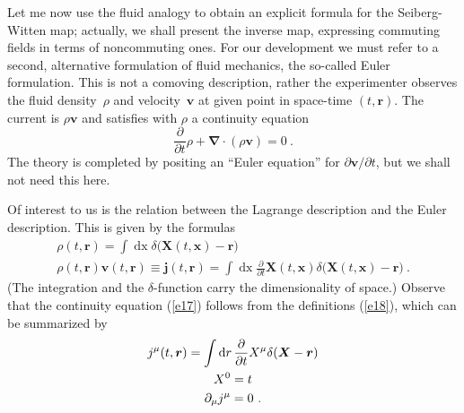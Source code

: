 \documentclass[a4paper,12pt,twoside]{article}
\newcommand{\rd}[1]{\mathop{\mathrm{d}#1}}
\newcommand{\grad}{\vec\nabla}
\newcommand{\numeq}[2]{\begin{equation}
#2
\label{#1}
\end{equation}}
\newcommand{\refeq}[1]{(\ref{#1})}
\let\vec\boldsymbol
\begin{document}
Let me now use the fluid analogy to obtain an explicit formula for the Seiberg-Witten map;
actually, we shall present the inverse map, expressing commuting fields in terms of
noncommuting ones. For our development we must refer to a second, alternative formulation
of fluid mechanics, the so-called Euler formulation. This is not a comoving description, rather
the experimenter observes the fluid density~$\rho$ and velocity~$\vec v$ at given point in
space-time $(t,\vec r)$. The current is $\rho \vec v$ and satisfies with $\rho$ a continuity
equation
\numeq{e17}{
\frac\partial{\partial t} \rho + \grad \cdot (\rho\vec v) = 0\ . 
}
The theory is completed by  positing an ``Euler equation'' for $\partial\vec v/\partial t$, but
we shall not need this here. 

Of interest to us is the relation between the Lagrange description and the Euler description.
This is given by the formulas
\begin{subequations}\label{e18}
\begin{gather}
\rho(t,\vec r) = \int \rd x \delta\bigl(\vec X(t,\vec x) -\vec r\bigr)\label{e18a}\\
\rho(t,\vec r)\vec v(t,\vec r) \equiv \vec j(t,\vec r) = 
    \int \rd x \frac\partial{\partial t} \vec X(t,\vec x) \delta \bigl(\vec X(t,\vec x) -\vec
r\bigr)\ . \label{e18b}
\end{gather}
\end{subequations}
(The integration and the $\delta$-function carry the dimensionality of space.) Observe that
the continuity equation \refeq{e17} follows from the definitions \refeq{e18}, which can be
summarized by 
\begin{gather}
j^\mu(t,\vec r) = \int \rd r \frac{\partial}{\partial t}  X^\mu \delta (\vec X - \vec
r)\label{e19}\\ X^0 = t\notag\\
\partial_\mu  j^\mu = 0\ . \label{e20}
\end{gather}
\end{document}

